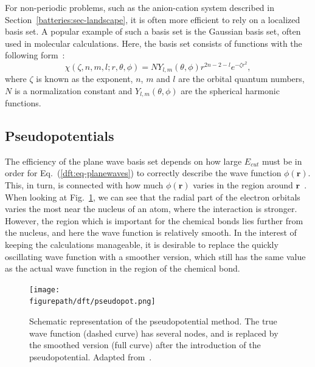 \begin{refsection}
 \label{dft:sec-gaussian}
For non-periodic problems, such as the anion-cation system described in Section~\ref{batteries:sec-landscape}, it is often more efficient to rely on a localized basis set. A popular example of such a basis set is the Gaussian basis set, often used in molecular calculations. Here, the basis set consists of functions with the following form~\cite{Hill2013}: 
\begin{equation}
\chi(\zeta, n, m, l; r, \theta, \phi) = N Y_{l,m}(\theta, \phi) r^{2n-2-l} e^{-\zeta r^2},
\end{equation}
where $\zeta$ is known as the exponent, $n$, $m$ and $l$ are the orbital quantum numbers, $N$ is a normalization constant and $Y_{l,m}(\theta, \phi)$ are the spherical harmonic functions. 
 
\subsection{Pseudopotentials} 
 
The efficiency of the plane wave basis set depends on 
how large $E_{cut}$ must be in order for Eq.~(\ref{dft:eq-planewaves}) to correctly describe the wave function $\phi (\mathbf{r})$. 
This, in turn, is connected with how much $\phi (\mathbf{r})$ varies in the 
region around $\mathbf{r}$~\cite{Kohanoff2006}. When looking at 
Fig.~\ref{dft:fig-pseudo}, we can see that the radial part of the electron 
orbitals varies the most near the nucleus of an atom, where the interaction is 
stronger. However, the region which is important for the chemical bonds lies 
further from the nucleus, and here the wave function is relatively smooth. In the 
interest of keeping the calculations manageable, it is desirable to replace 
the quickly oscillating wave function with a smoother version, which still has 
the same value as the actual wave function in the region of the chemical bond. 
 
\begin{figure}[ht]  
\captionsetup{width=0.8\textwidth} 
\centering 
\texttt{[image: \\figurepath/dft/pseudopot.png]} 
\caption{\label{dft:fig-pseudo} Schematic representation of the pseudopotential 
method. The true wave function (dashed curve) has several nodes, and is 
replaced by the smoothed version (full curve) after the introduction of the 
pseudopotential. Adapted from~\cite{Singh2006}.} 
\end{figure} 
 

\end{refsection}
